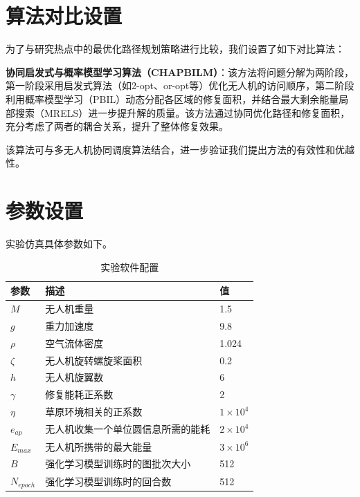 \documentclass[AutoFakeBold]{LZUThesis}
\begin{document}
\section{算法对比设置}

为了与研究热点中的最优化路径规划策略\cite{aggarwal2020path}进行比较，我们设置了如下对比算法：

\textbf{协同启发式与概率模型学习算法（CHAPBILM）\cite{JIAO2024108084}}：该方法将问题分解为两阶段，第一阶段采用启发式算法（如2-opt、or-opt等）优化无人机的访问顺序，第二阶段利用概率模型学习（PBIL）动态分配各区域的修复面积，并结合最大剩余能量局部搜索（MRELS）进一步提升解的质量。该方法通过协同优化路径和修复面积，充分考虑了两者的耦合关系，提升了整体修复效果。

该算法可与多无人机协同调度算法结合，进一步验证我们提出方法的有效性和优越性。
\section{参数设置}
实验仿真具体参数如下。

\label{sub:无人机参数表格}
\begin{table}[H]
	\centering
	\caption{实验软件配置}
	\begin{tabular}{lll} %
		\toprule
		参数              & 描述                & 值                   \\
		\midrule
		\( M \)         & 无人机重量             & 1.5                 \\
		\( g \)         & 重力加速度             & 9.8                 \\
		\( \rho \)      & 空气流体密度            & 1.024               \\
		\( \zeta \)     & 无人机旋转螺旋桨面积        & 0.2                 \\
		\( h \)         & 无人机旋翼数            & 6                   \\
		\( \gamma \)    & 修复能耗正系数           & 2                   \\
		\( \eta \)      & 草原环境相关的正系数        & \( 1 \times 10^4 \) \\
		\( e_{ap} \)    & 无人机收集一个单位圆信息所需的能耗 & \( 2 \times 10^4 \) \\
		\( E_{max} \)   & 无人机所携带的最大能量       & \( 3 \times 10^6 \) \\
		\( B \)         & 强化学习模型训练时的图批次大小   & 512                 \\
		\( N_{epoch} \) & 强化学习模型训练时的回合数     & 512                 \\
		\bottomrule
	\end{tabular}
	\label{tbl_drone_parameters}
\end{table}
\end{document}
